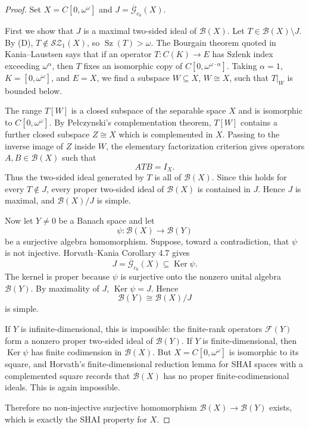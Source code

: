 \documentclass[11pt]{article}
\newcommand{\B}{\mathscr{B}}
\newcommand{\G}{\mathscr{G}}
\newcommand{\F}{\mathscr{F}}
\newcommand{\SZ}{\mathscr{S\!Z}}
\newcommand{\Id}{I}
\newcommand{\Ker}{\operatorname{Ker}}
\newcommand{\Sz}{\operatorname{Sz}}
\begin{document}
\begin{proof}
Set \(X=C[0,\omega^\omega]\) and \(J=\overline{\G}_{c_0}(X)\).

First we show that \(J\) is a maximal two-sided ideal of \(\B(X)\).  Let
\(T\in\B(X)\setminus J\).  By (D), \(T\notin \SZ_1(X)\), so
\(\Sz(T)>\omega\).  The Bourgain theorem quoted in Kania--Laustsen says that
if an operator \(T:C(K)\to E\) has Szlenk index exceeding \(\omega^\alpha\),
then \(T\) fixes an isomorphic copy of
\(C[0,\omega^{\omega\cdot\alpha}]\).  Taking \(\alpha=1\), \(K=[0,\omega^\omega]\),
and \(E=X\), we find a subspace \(W\subseteq X\), \(W\cong X\), such that
\(T|_W\) is bounded below.

The range \(T[W]\) is a closed subspace of the separable space \(X\) and is
isomorphic to \(C[0,\omega^\omega]\).  By Pe\l{}czynski's complementation
theorem, \(T[W]\) contains a further closed subspace \(Z\cong X\) which is
complemented in \(X\).  Passing to the inverse image of \(Z\) inside \(W\),
the elementary factorization criterion gives operators \(A,B\in\B(X)\) such
that
\[
A T B=\Id_X.
\]
Thus the two-sided ideal generated by \(T\) is all of \(\B(X)\).  Since this
holds for every \(T\notin J\), every proper two-sided ideal of \(\B(X)\) is
contained in \(J\).  Hence \(J\) is maximal, and \(\B(X)/J\) is simple.

Now let \(Y\neq 0\) be a Banach space and let
\[
\psi:\B(X)\longrightarrow \B(Y)
\]
be a surjective algebra homomorphism.  Suppose, toward a contradiction, that
\(\psi\) is not injective.  Horvath--Kania Corollary 4.7 gives
\[
J=\overline{\G}_{c_0}(X)\subseteq \Ker\psi.
\]
The kernel is proper because \(\psi\) is surjective onto the nonzero unital
algebra \(\B(Y)\).  By maximality of \(J\), \(\Ker\psi=J\).  Hence
\[
\B(Y)\cong \B(X)/J
\]
is simple.

If \(Y\) is infinite-dimensional, this is impossible: the finite-rank
operators \(\F(Y)\) form a nonzero proper two-sided ideal of \(\B(Y)\).
If \(Y\) is finite-dimensional, then \(\Ker\psi\) has finite codimension in
\(\B(X)\).  But \(X=C[0,\omega^\omega]\) is isomorphic to its square, and
Horvath's finite-dimensional reduction lemma for SHAI spaces with a
complemented square records that \(\B(X)\) has no proper finite-codimensional
ideals.  This is again impossible.

Therefore no non-injective surjective homomorphism \(\B(X)\to\B(Y)\) exists,
which is exactly the SHAI property for \(X\).
\end{proof}
\end{document}
